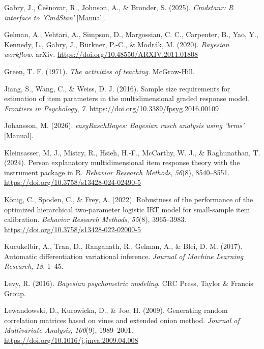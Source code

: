 \documentclass[
  man,
  floatsintext,
  longtable,
  nolmodern,
  notxfonts,
  notimes,
  colorlinks=true,linkcolor=blue,citecolor=blue,urlcolor=blue]{apa7}
\newlength{\cslhangindent}
\newenvironment{CSLReferences}[2] %
 {\begin{list}{}{%
  \setlength{\itemindent}{0pt}
  \setlength{\leftmargin}{0pt}
  \setlength{\parsep}{0pt}
  \ifodd #1
   \setlength{\leftmargin}{\cslhangindent}
   \setlength{\itemindent}{-1\cslhangindent}
  \fi
  \setlength{\itemsep}{#2\baselineskip}}}
 {\end{list}}
\begin{document}
\begin{CSLReferences}{1}{0}
Gabry, J., Češnovar, R., Johnson, A., \& Bronder, S. (2025).
\emph{Cmdstanr: {R} interface to '{CmdStan}'} {[}Manual{]}.

Gelman, A., Vehtari, A., Simpson, D., Margossian, C. C., Carpenter, B.,
Yao, Y., Kennedy, L., Gabry, J., Bürkner, P.-C., \& Modrák, M. (2020).
\emph{Bayesian workflow}. arXiv.
\url{https://doi.org/10.48550/ARXIV.2011.01808}

Green, T. F. (1971). \emph{The activities of teaching}. McGraw-Hill.

Jiang, S., Wang, C., \& Weiss, D. J. (2016). Sample size requirements
for estimation of item parameters in the multidimensional graded
response model. \emph{Frontiers in Psychology}, \emph{7}.
\url{https://doi.org/10.3389/fpsyg.2016.00109}

Johansson, M. (2026). \emph{{easyRaschBayes}: {Bayesian} rasch analysis
using 'brms'} {[}Manual{]}.

Kleinsasser, M. J., Mistry, R., Hsieh, H.-F., McCarthy, W. J., \&
Raghunathan, T. (2024). Person explanatory multidimensional item
response theory with the instrument package in {R}. \emph{Behavior
Research Methods}, \emph{56}(8), 8540--8551.
\url{https://doi.org/10.3758/s13428-024-02490-5}

König, C., Spoden, C., \& Frey, A. (2022). Robustness of the performance
of the optimized hierarchical two-parameter logistic {IRT} model for
small-sample item calibration. \emph{Behavior Research Methods},
\emph{55}(8), 3965--3983.
\url{https://doi.org/10.3758/s13428-022-02000-5}

Kucukelbir, A., Tran, D., Ranganath, R., Gelman, A., \& Blei, D. M.
(2017). Automatic differentiation variational inference. \emph{Journal
of Machine Learning Research}, \emph{18}, 1--45.

Levy, R. (2016). \emph{Bayesian psychometric modeling}. CRC Press,
Taylor \& Francis Group.

Lewandowski, D., Kurowicka, D., \& Joe, H. (2009). Generating random
correlation matrices based on vines and extended onion method.
\emph{Journal of Multivariate Analysis}, \emph{100}(9), 1989--2001.
\url{https://doi.org/10.1016/j.jmva.2009.04.008}


\end{CSLReferences}
\end{document}

